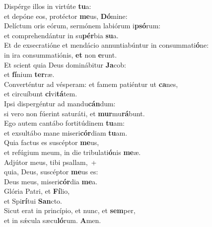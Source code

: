\evenverse Dispérge illos in virtúte \textbf{tu}a:~\*\\
\evenverse et depóne eos, protéctor \textbf{me}us, \textbf{Dó}mine:\\
\oddverse Delíctum oris eórum, sermónem labiórum i\textbf{psó}rum:~\*\\
\oddverse et comprehendántur in su\textbf{pér}bia \textbf{su}a.\\
\evenverse Et de exsecratióne et mendácio annuntiabúntur in consummati\textbf{ó}ne:~\*\\
\evenverse in ira consummatiónis, \textbf{et} non \textbf{e}runt.\\
\oddverse Et scient quia Deus dominábitur \textbf{Ja}cob:~\*\\
\oddverse et \textbf{fí}nium \textbf{ter}ræ.\\
\evenverse Converténtur ad vésperam: et famem patiéntur ut \textbf{ca}nes,~\*\\
\evenverse et circuíbunt \textbf{ci}vi\textbf{tá}tem.\\
\oddverse Ipsi dispergéntur ad mandu\textbf{cán}dum:~\*\\
\oddverse si vero non fúerint saturáti, et \textbf{mur}mu\textbf{rá}bunt.\\
\evenverse Ego autem cantábo fortitúdinem \textbf{tu}am:~\*\\
\evenverse et exsultábo mane miseri\textbf{cór}diam \textbf{tu}am.\\
\oddverse Quia factus es suscéptor \textbf{me}us,~\*\\
\oddverse et refúgium meum, in die tribulati\textbf{ó}nis \textbf{me}æ.\\
\evenverse Adjútor meus, tibi psallam,~+\\
\evenverse  quia, Deus, suscéptor \textbf{me}us es:~\*\\
\evenverse Deus meus, miseri\textbf{cór}dia \textbf{me}a.\\
\oddverse Glória Patri, et \textbf{Fí}lio,~\*\\
\oddverse et Spi\textbf{rí}tui \textbf{San}cto.\\
\evenverse Sicut erat in princípio, et nunc, et \textbf{sem}per,~\*\\
\evenverse et in sǽcula sæcu\textbf{ló}rum. \textbf{A}men.\\
